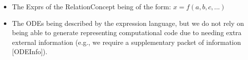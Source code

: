 \begin{itemize}
\begin{itemize}
                  \item The Exprs of the RelationConcept being of the form: $x =
                              f(a,b,c,...)$

                  \item The ODEs being described by the expression language, but
                        we do not rely on being able to generate representing
                        computational code due to needing extra external
                        information (e.g., we require a supplementary packet of
                        information [ODEInfo]).

            \end{itemize}

\end{itemize}

\caseStudiesCodeTable



